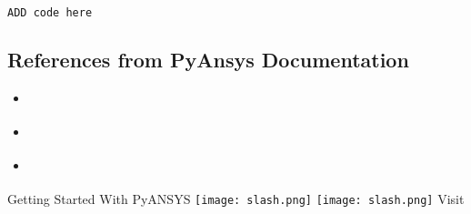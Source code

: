 \documentclass[9pt,landscape]{article}
\begin{document}
\begin{multicols}{3}
\begin{lstlisting}[language=Python]
ADD code here

\end{lstlisting}


\subsection{References from PyAnsys Documentation}
\begin{itemize}
\item \href{usefullinks}{\color{blue}{name of link}}
\item \href{useful_links}{\color{blue}{name of link}}
\item \href{useful_links}{\color{blue}{name of link}}
\end{itemize}
\end{multicols}

\vspace{-0.15cm}
\noindent\makebox[\linewidth]{\rule{\paperwidth}{4pt}}
\begin{center}
Getting Started With PyANSYS \texttt{[image: slash.png]} \href{https://github.com/pyansys}{\color{blue}{PyANSYS on GitHub}} \texttt{[image: slash.png]} Visit 
\end{center}
\end{document}

